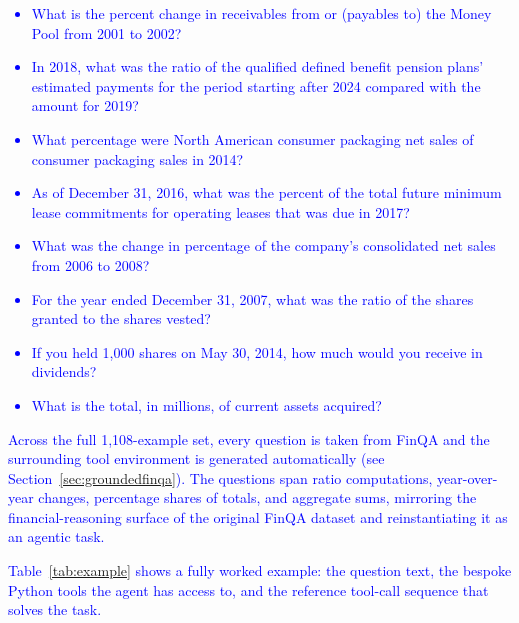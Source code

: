 \documentclass[11pt]{article}
\newcommand{\edit}[1]{\textcolor{blue}{#1}}
\begin{document}
\edit{\begin{itemize}
    \item What is the percent change in receivables from or (payables to) the Money Pool from 2001 to 2002?
    \item In 2018, what was the ratio of the qualified defined benefit pension plans' estimated payments for the period starting after 2024 compared with the amount for 2019?
    \item What percentage were North American consumer packaging net sales of consumer packaging sales in 2014?
    \item As of December 31, 2016, what was the percent of the total future minimum lease commitments for operating leases that was due in 2017?
    \item What was the change in percentage of the company's consolidated net sales from 2006 to 2008?
    \item For the year ended December 31, 2007, what was the ratio of the shares granted to the shares vested?
    \item If you held 1{,}000 shares on May 30, 2014, how much would you receive in dividends?
    \item What is the total, in millions, of current assets acquired?
\end{itemize}}

\edit{Across the full 1{,}108-example set, every question is taken from FinQA and the surrounding tool environment is generated automatically (see Section~\ref{sec:groundedfinqa}). The questions span ratio computations, year-over-year changes, percentage shares of totals, and aggregate sums, mirroring the financial-reasoning surface of the original FinQA dataset and reinstantiating it as an agentic task.}

\edit{Table~\ref{tab:example} shows a fully worked example: the question text, the bespoke Python tools the agent has access to, and the reference tool-call sequence that solves the task.}
\end{document}
